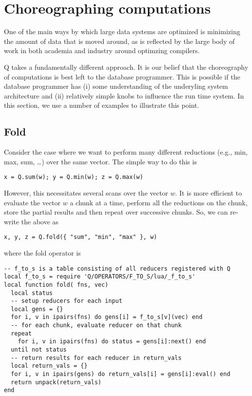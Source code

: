 \section{Choreographing computations}

One of the main ways by which large data systems are optimized is minimizing the
amount of data that is moved around, as is reflected by the large body of work in
both academia and industry around optimzing compilers. 

Q takes a fundamentally different approach. It is our belief that the
choreography of computations is best left to the database programmer. This is
possible if the database programmer has (i) some understanding of the underyling
system architecture and (ii) relatively simple knobs to influence the run time
system.  In this section, we use a number of examples to illustrate this point.


\subsection{Fold}
Consider the case where we want to perform many different reductions (e.g., min,
max, sum, \ldots) over the same vector. The simple way to do this is
\begin{verbatim}
x = Q.sum(w); y = Q.min(w); z = Q.max(w)
\end{verbatim}
However, this necessitates several scans over the vector \(w\). It is more
efficient to evaluate the vector \(w\) a chunk at a time, perform all the
reductions on the chunk, store the partial results and then repeat over
successive chunks. So, we can re-write the above as 
\begin{verbatim}
x, y, z = Q.fold({ "sum", "min", "max" }, w)
\end{verbatim}
where the fold operator is 
\begin{verbatim}
-- f_to_s is a table consisting of all reducers registered with Q
local f_to_s = require 'Q/OPERATORS/F_TO_S/lua/_f_to_s'
local function fold( fns, vec)
  local status
  -- setup reducers for each input 
  local gens = {} 
  for i, v in ipairs(fns) do gens[i] = f_to_s[v](vec) end
  -- for each chunk, evaluate reducer on that chunk
  repeat 
    for i, v in ipairs(fns) do status = gens[i]:next() end 
  until not status
  -- return results for each reducer in return_vals
  local return_vals = {}
  for i, v in ipairs(gens) do return_vals[i] = gens[i]:eval() end
  return unpack(return_vals)
end
\end{verbatim}


